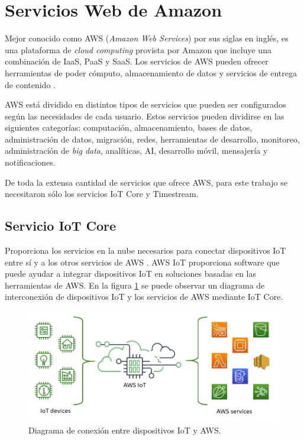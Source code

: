 \section{Servicios Web de Amazon}
Mejor conocido como AWS (\textit{Amazon Web Services}) por sus siglas en inglés, es una plataforma de \textit{cloud computing} provista por Amazon que incluye una combinación de IaaS, PaaS y SaaS. Los servicios de AWS pueden ofrecer herramientas de poder cómputo, almacenamiento de datos y servicios de entrega de contenido \cite{aws_info}.

AWS está dividido en distintos tipos de servicios que pueden ser configurados según las necesidades de cada usuario. Estos servicios pueden dividirse en las siguientes categorías: computación, almacenamiento, bases de datos, administración de datos, migración, redes, herramientas de desarrollo, monitoreo, administración de \textit{big data}, analíticas, AI, desarrollo móvil, mensajería y notificaciones.

De toda la extensa cantidad de servicios que ofrece AWS, para este trabajo se necesitaron sólo los servicios IoT Core y Timestream.

\subsection{Servicio IoT Core}
Proporciona los servicios en la nube necesarios para conectar dispositivos IoT entre sí y a los otros servicios de AWS \cite{iot_info}. AWS IoT proporciona software que puede ayudar a integrar dispositivos IoT en soluciones basadas en las herramientas de AWS. En la figura \ref{fig:aws_iot} se puede observar un diagrama de interconexión de dispositivos IoT y los servicios de AWS mediante IoT Core.

\begin{figure}[h]
	\centering
	\includegraphics[scale=0.5]{./Figures/aws_iot.png}
	\caption{Diagrama de conexión entre dispositivos IoT y AWS\protect\footnotemark.}
	\label{fig:aws_iot}
\end{figure}

